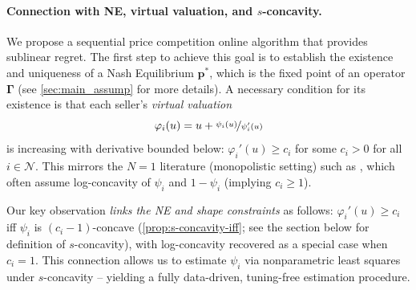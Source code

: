 \documentclass{article} %
\begin{document}
\paragraph{Connection with NE, virtual valuation, and \ensuremath{s}-concavity.}\label{sec:related:NE-s-conc}
We propose a sequential price competition online algorithm that provides sublinear regret. The first step to achieve this goal is to establish the existence and uniqueness of a Nash Equilibrium $\mathbf{p^*}$, which is the fixed point of an operator $\boldsymbol{\Gamma}$ (see \cref{sec:main_assump} for more details). A necessary condition for its existence is that each seller’s \emph{virtual valuation}
\begin{equation}\label{def:virtual_valu}
\varphi_i(u)=u+\nicefrac{\psi_i(u)}{\psi_i'(u)}
\end{equation}
is increasing with derivative bounded below: $\varphi_i'(u)\ge c_i$ for some $c_i>0$ for all $i \in \mathcal{N}$. This mirrors the $N=1$ literature (monopolistic setting) such as \cite{fan2024policy,chen2018robust,cole2014sample,golrezaei2019dynamic,javanmard2017perishability,javanmard2019dynamic}, which often assume log-concavity of $\psi_i$ and $1-\psi_i$ (implying $c_i\ge1$).

Our key observation \emph{links the NE and shape constraints} as follows: $\varphi_i'(u)\ge c_i$ iff $\psi_i$ is $(c_i-1)$-concave (\cref{prop:s-concavity-iff}; see the section below for definition of $s$-concavity), with log-concavity recovered as a special case when $c_i = 1$. This connection allows us to estimate $\psi_i$ via nonparametric least squares under $s$-concavity -- yielding a fully data-driven, tuning-free estimation procedure.
\end{document}
